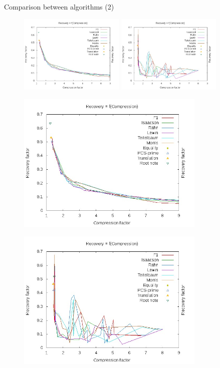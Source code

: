 \documentclass[10pt]{beamer}
\begin{document}
\begin{frame}{Comparison between algorithms (2)}
 {
\begin{figure}
\centering
\includegraphics[width = 5cm]{images/RfC77.jpg} \hspace{0.5cm}
\includegraphics[width = 5cm]{images/RfCDiag.jpg}
\end{figure}}

 {
\begin{figure}
\centering
\includegraphics[width = 9cm]{images/RfC77.jpg}
\end{figure}}

 {
\begin{figure}
\centering
\includegraphics[width = 9cm]{images/RfCDiag.jpg}
\end{figure}}
\end{frame}
\end{document}
